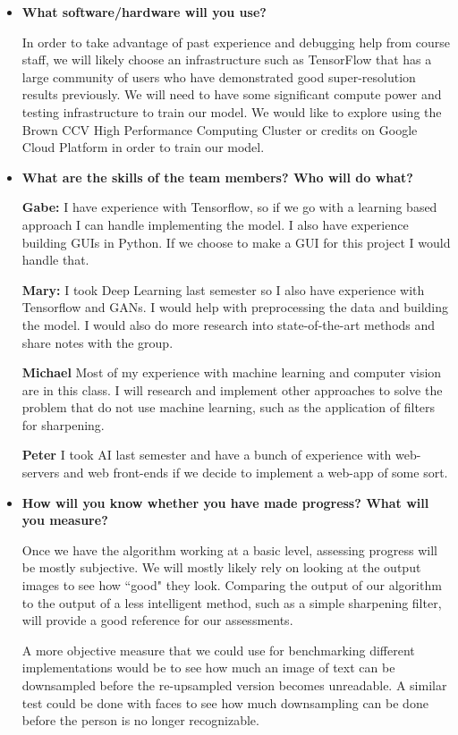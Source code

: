 \begin{itemize}
  \item \textbf{What software/hardware will you use?}
  
  In order to take advantage of past experience and debugging help from course staff, we will likely choose an infrastructure such as TensorFlow that has a large community of users who have demonstrated good super-resolution results previously.  We will need to have some significant compute power and testing infrastructure to train our model. We would like to explore using the Brown CCV High Performance Computing Cluster or credits on Google Cloud Platform in order to train our model. 
  
  \item \textbf{What are the skills of the team members? Who will do what?}
  
  \textbf{Gabe:} I have experience with Tensorflow, so if we go with a learning based approach I can handle implementing the model. I also have experience building GUIs in Python. If we choose to make a GUI for this project I would handle that. 
  
  \textbf{Mary:} I took Deep Learning last semester so I also have experience with Tensorflow and GANs. I would help with preprocessing the data and building the model. I would also do more research into state-of-the-art methods and share notes with the group.

  \textbf{Michael} Most of my experience with machine learning and computer vision are in this class. I will research and implement other approaches to solve the problem that do not use machine learning, such as the application of filters for sharpening.
  
  \textbf{Peter} I took AI last semester and have a bunch of experience with web-servers and web front-ends if we decide to implement a web-app of some sort.  
  
  \item \textbf{How will you know whether you have made progress? What will you measure?}
  
  Once we have the algorithm working at a basic level, assessing progress will be mostly subjective. We will mostly likely rely on looking at the output images to see how ``good" they look. Comparing the output of our algorithm to the output of a less intelligent method, such as a simple sharpening filter, will provide a good reference for our assessments.
  
  A more objective measure that we could use for benchmarking different implementations would be to see how much an image of text can be downsampled before the re-upsampled version becomes unreadable. A similar test could be done with faces to see how much downsampling can be done before the person is no longer recognizable. 
  

\end{itemize}
